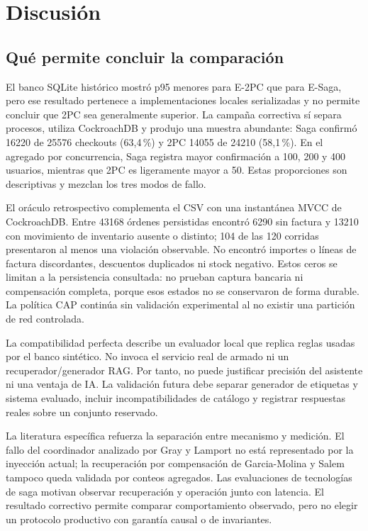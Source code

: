 \documentclass[12pt,a4paper]{article}
\newcommand{\seccion}[1]{\section{#1}}
\begin{document}


\seccion{Discusión}
\subsection{Qué permite concluir la comparación}
El banco SQLite histórico mostró p95 menores para E-2PC que para E-Saga, pero ese resultado pertenece a implementaciones locales serializadas y no permite concluir que 2PC sea generalmente superior. La campaña correctiva sí separa procesos, utiliza CockroachDB y produjo una muestra abundante: Saga confirmó 16220 de 25576 checkouts (63,4\,\%) y 2PC 14055 de 24210 (58,1\,\%). En el agregado por concurrencia, Saga registra mayor confirmación a 100, 200 y 400 usuarios, mientras que 2PC es ligeramente mayor a 50. Estas proporciones son descriptivas y mezclan los tres modos de fallo.

El oráculo retrospectivo complementa el CSV con una instantánea MVCC de CockroachDB. Entre 43168 órdenes persistidas encontró 6290 sin factura y 13210 con movimiento de inventario ausente o distinto; 104 de las 120 corridas presentaron al menos una violación observable. No encontró importes o líneas de factura discordantes, descuentos duplicados ni stock negativo. Estos ceros se limitan a la persistencia consultada: no prueban captura bancaria ni compensación completa, porque esos estados no se conservaron de forma durable. La política CAP continúa sin validación experimental al no existir una partición de red controlada.

La compatibilidad perfecta describe un evaluador local que replica reglas usadas por el banco sintético. No invoca el servicio real de armado ni un recuperador/generador RAG. Por tanto, no puede justificar precisión del asistente ni una ventaja de IA. La validación futura debe separar generador de etiquetas y sistema evaluado, incluir incompatibilidades de catálogo y registrar respuestas reales sobre un conjunto reservado.

La literatura específica refuerza la separación entre mecanismo y medición. El fallo del coordinador analizado por Gray y Lamport \cite{gray2006commit} no está representado por la inyección actual; la recuperación por compensación de Garcia-Molina y Salem \cite{garciamolina1987sagas} tampoco queda validada por conteos agregados. Las evaluaciones de tecnologías de saga \cite{stefanko2019saga,durr2022saga} motivan observar recuperación y operación junto con latencia. El resultado correctivo permite comparar comportamiento observado, pero no elegir un protocolo productivo con garantía causal o de invariantes.
\end{document}

